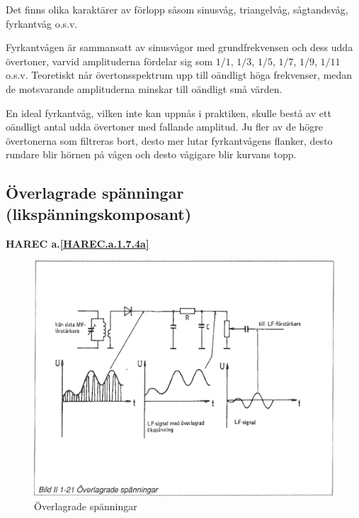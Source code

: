 
Det finns olika karaktärer av förlopp såsom sinusvåg, triangelvåg, sågtandsvåg,
fyrkantvåg o.s.v.

Fyrkantvågen är sammansatt av sinusvågor med grundfrekvensen och dess udda
övertoner, varvid amplituderna fördelar sig som \(1/1\), \(1/3\), \(1/5\),
\(1/7\), \(1/9\), \(1/11\) o.s.v. Teoretiskt når övertonsspektrum upp till
oändligt höga frekvenser, medan de motsvarande amplituderna minskar till
oändligt små värden.

En ideal fyrkantvåg, vilken inte kan uppnås i praktiken, skulle bestå av ett
oändligt antal udda övertoner med fallande amplitud. Ju fler av de högre
övertonerna som filtreras bort, desto mer lutar fyrkantvågens flanker, desto
rundare blir hörnen på vågen och desto vågigare blir kurvans topp.

\subsection{Överlagrade spänningar
(likspänningskomposant)}
\textbf{HAREC a.\ref{HAREC.a.1.7.4a}\label{myHAREC.a.1.7.4a}}

\begin{figure}[h]
\includegraphics[width=\textwidth]{images/bild_2_1-21}
\caption{Överlagrade spänningar}
\label{fig:BildII1-21}
\end{figure}

